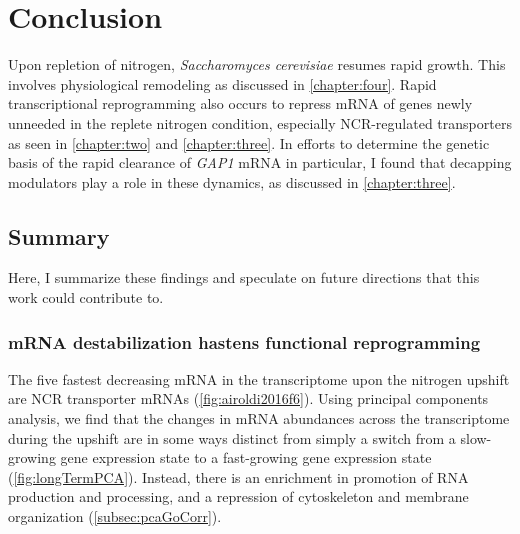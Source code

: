 \chapter{Conclusion}
\label{chapter:five}


Upon repletion of nitrogen, \textit{Saccharomyces cerevisiae} 
resumes rapid growth.
This involves physiological remodeling as discussed in
\autoref{chapter:four}.
Rapid transcriptional reprogramming also occurs to repress mRNA of 
genes newly unneeded in the replete nitrogen condition, especially
NCR-regulated transporters as seen in \autoref{chapter:two} and
\autoref{chapter:three}.
In efforts to determine the genetic basis of the rapid clearance of
\textit{GAP1} mRNA in particular, I found that decapping modulators
play a role in these dynamics, as discussed in \autoref{chapter:three}. 

\section{Summary}

Here, I summarize these findings and speculate on future
directions that this work could contribute to.

\subsection{mRNA destabilization hastens functional reprogramming}

The five fastest decreasing mRNA in the transcriptome upon the
nitrogen upshift are NCR transporter mRNAs
(\autoref{fig:airoldi2016f6}).
Using principal components analysis, 
we find that the changes in mRNA abundances across the transcriptome
during the upshift are in some ways distinct from simply a switch
from a slow-growing gene expression state to a fast-growing gene
expression state (\autoref{fig:longTermPCA}).
Instead, there is an enrichment in promotion of RNA production and
processing, and a repression of cytoskeleton and membrane
organization (\autoref{subsec:pcaGoCorr}).

